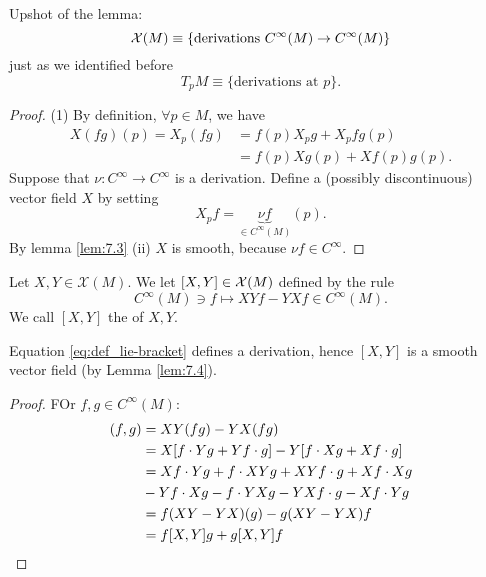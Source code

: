 Upshot of the lemma: \[\mathcal{X}(M)\equiv \{\text{derivations } C^\infty(M)\to C^\infty(M)\}\]
just as we identified before 
\[T_pM\equiv \{\text{derivations at } p\}.\]

\begin{proof}
    (1) By definition, \(\forall p\in M\), we have 
    \begin{align*}
        X(fg)(p)=X_p(fg)&=f(p)X_pg+X_pf g(p)\\
        &= f(p)Xg(p) + Xf(p)g(p).
    \end{align*}
    Suppose that \(\nu:C^\infty\to C^\infty\) is a derivation. Define a (possibly discontinuous) 
    vector field \(X\) by setting
    \[X_pf=\underbrace{\nu f}_{\in C^\infty(M)}(p).\]
    By lemma \ref{lem:7.3} (ii) \(X\) is smooth, because \(\nu f\in C^\infty\).
\end{proof}

\begin{definition*}
    Let \(X,Y\in \mathcal{X}(M)\). We let \([X,Y]\in \mathcal{X}(M)\) defined by the rule 
    \begin{equation}\label{eq:def_lie-bracket}
        C^\infty(M)\ni f\mapsto XYf-YXf \in C^\infty(M).
    \end{equation}
    We call \([X,Y]\) the  of \(X,Y\).
\end{definition*}

\begin{lemma}\label{lem:7.5}
    Equation \ref{eq:def_lie-bracket} defines a derivation, hence \([X,Y]\)
    is a smooth vector field (by Lemma \ref{lem:7.4}). 
\end{lemma}

\begin{proof}
    FOr \(f,g\in C^\infty(M)\):
    \begin{align*}
        [X,Y](f,g)&=XY(fg)-YX(fg) \\
        &=X[f\cdot Yg+ Yf \cdot g]- Y [f\cdot Xg + Xf\cdot g]\\
        &=Xf\cdot Yg+f\cdot XYg+ XY f\cdot g + Xf\cdot Xg\\
        & -Yf\cdot X g- f\cdot YXg-YXf \cdot g- Xf\cdot Yg\\
        &= f(XY-YX)(g)-g(XY-YX)f \\
        &= f[X,Y]g+g[X,Y]f\qedhere 
    \end{align*}
\end{proof}


